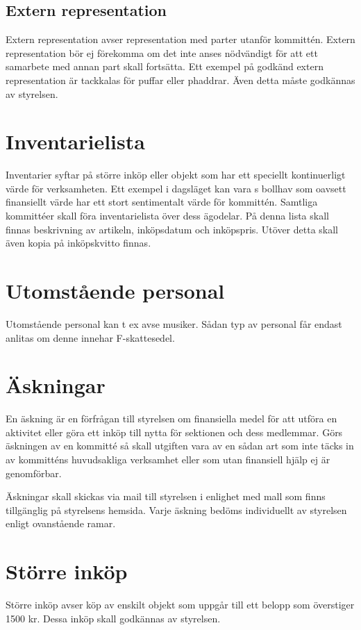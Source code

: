 \documentclass[11pt, includeaddress]{classes/cthit}
\begin{document}
\subsection{Extern representation}
Extern representation avser representation med parter utanför kommittén. Extern representation bör ej förekomma om det inte anses nödvändigt för att ett samarbete med annan part skall fortsätta. Ett exempel på godkänd extern representation är tackkalas för puffar eller phaddrar. Även detta måste godkännas av styrelsen.


\section{Inventarielista}
Inventarier syftar på större inköp eller objekt som har ett speciellt kontinuerligt värde för verksamheten. Ett exempel i dagsläget kan vara \NOLLKIT{}s bollhav som oavsett finansiellt värde har ett stort sentimentalt värde för kommittén. Samtliga kommittéer skall föra inventarielista över dess ägodelar. På denna lista skall finnas beskrivning av artikeln, inköpsdatum och inköpspris. Utöver detta skall även kopia på inköpskvitto finnas.


\section{Utomstående personal}
Utomstående personal kan t ex avse musiker. Sådan typ av personal får endast anlitas om denne innehar F-skattesedel. 


\section{Äskningar}
En äskning är en förfrågan till styrelsen om finansiella medel för att utföra en aktivitet eller göra ett inköp till nytta för sektionen och dess medlemmar. Görs äskningen av en kommitté så skall utgiften vara av en sådan art som inte täcks in av kommitténs huvudsakliga verksamhet eller som utan finansiell hjälp ej är genomförbar. 

Äskningar skall skickas via mail till styrelsen i enlighet med mall som finns tillgänglig på styrelsens hemsida. Varje äskning bedöms individuellt av styrelsen enligt ovanstående ramar. 


\section{Större inköp}
Större inköp avser köp av enskilt objekt som uppgår till ett belopp som överstiger 1500 kr. Dessa inköp skall godkännas av styrelsen.
\end{document}
